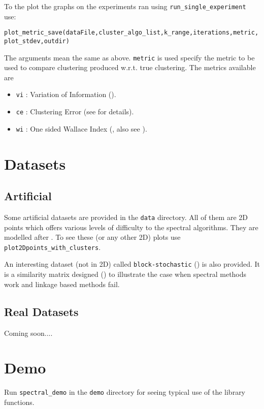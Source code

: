 \documentclass[10pt]{article}
\begin{document}
To the plot the graphs on the experiments ran using
\texttt{run\_single\_experiment} use:

\texttt{plot\_metric\_save(dataFile,cluster\_algo\_list,k\_range,iterations,metric,plot\_stdev,outdir)}

The arguments mean the same as above. \texttt{metric} is used  specify the metric to be used
to compare clustering produced w.r.t. true clustering. The metrics
available are 
\begin{itemize}
\item \texttt{vi} : Variation of Information (\cite{stat418}). 
\item \texttt{ce} : Clustering Error (see \cite{VM03} for details). 
  
\item \texttt{wi} : One sided Wallace Index (\cite{wallas}, also see
  \cite{VM03}). 
  
\end{itemize}



\section{Datasets}
\label{sec:data}


\subsection{Artificial}
\label{sec:artdata}

Some artificial datasets are provided in the \texttt{data}
directory. All of them are 2D points which offers various levels of
difficulty to the spectral algorithms. They are modelled after
\cite{NgJW01}. To see these (or any other 2D) plots use
\texttt{plot2Dpoints\_with\_clusters}. 

An interesting dataset (not in 2D) called \texttt{block-stochastic}
(\cite{MeilaS00}) is also provided. It is a similarity matrix designed
(\cite{VM03}) to illustrate the case when spectral methods work and
linkage based methods fail. 

\subsection{Real Datasets}
\label{sec:realdata}

Coming soon....

\section{Demo}

Run \texttt{spectral\_demo} in the \texttt{demo} directory for seeing typical
use of the library functions.   
\small{
  
  
}
\end{document}
